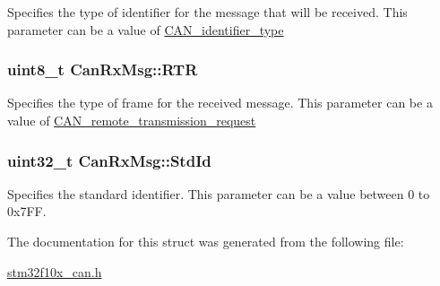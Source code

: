 \label{structCanRxMsg_a83a67d1a709cc01570ce956e5adc811f}
Specifies the type of identifier for the message that will be received. This parameter can be a value of \hyperlink{group__CAN__identifier__type}{CAN\_\-identifier\_\-type} \hypertarget{structCanRxMsg_a9a183149a391a24f86da2ce895f0f1c9}{
\subsubsection[{RTR}]{\setlength{\rightskip}{0pt plus 5cm}uint8\_\-t {\bf CanRxMsg::RTR}}}
\label{structCanRxMsg_a9a183149a391a24f86da2ce895f0f1c9}
Specifies the type of frame for the received message. This parameter can be a value of \hyperlink{group__CAN__remote__transmission__request}{CAN\_\-remote\_\-transmission\_\-request} \hypertarget{structCanRxMsg_a62769e18836146f71238bee6b43b531e}{
\subsubsection[{StdId}]{\setlength{\rightskip}{0pt plus 5cm}uint32\_\-t {\bf CanRxMsg::StdId}}}
\label{structCanRxMsg_a62769e18836146f71238bee6b43b531e}
Specifies the standard identifier. This parameter can be a value between 0 to 0x7FF. 

The documentation for this struct was generated from the following file:\begin{DoxyCompactItemize}
\item 
\hyperlink{stm32f10x__can_8h}{stm32f10x\_\-can.h}\end{DoxyCompactItemize}
